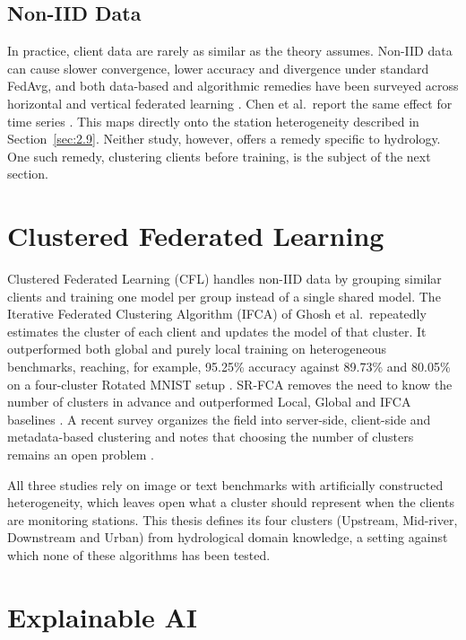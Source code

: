 \subsection{Non-IID Data}
\label{sec:2.10.3}

In practice, client data are rarely as similar as the theory assumes. Non-IID
data can cause slower convergence, lower accuracy and divergence under standard
FedAvg, and both data-based and algorithmic remedies have been surveyed across
horizontal and vertical federated learning \cite{Zhu2021}. Chen et al.\ report
the same effect for time series \cite{Chen2025}. This maps directly onto the
station heterogeneity described in Section~\ref{sec:2.9}. Neither study,
however, offers a remedy specific to hydrology. One such remedy, clustering
clients before training, is the subject of the next section.

\section{Clustered Federated Learning}
\label{sec:2.11}

Clustered Federated Learning (CFL) handles non-IID data by grouping similar
clients and training one model per group instead of a single shared model. The
Iterative Federated Clustering Algorithm (IFCA) of Ghosh et al.\ repeatedly
estimates the cluster of each client and updates the model of that cluster. It
outperformed both global and purely local training on heterogeneous
benchmarks, reaching, for example, 95.25\% accuracy against 89.73\% and
80.05\% on a four-cluster Rotated MNIST setup \cite{Ghosh2021}. SR-FCA removes
the need to know the number of clusters in advance and outperformed Local,
Global and IFCA baselines \cite{Harshvardhan2022}. A recent survey organizes the
field into server-side, client-side and metadata-based clustering and notes
that choosing the number of clusters remains an open problem
\cite{BenAli2026}.

All three studies rely on image or text benchmarks with artificially
constructed heterogeneity, which leaves open what a cluster should represent
when the clients are monitoring stations. This thesis defines its four
clusters (Upstream, Mid-river, Downstream and Urban) from hydrological domain
knowledge, a setting against which none of these algorithms has been tested.

\section{Explainable AI}
\label{sec:2.12}

